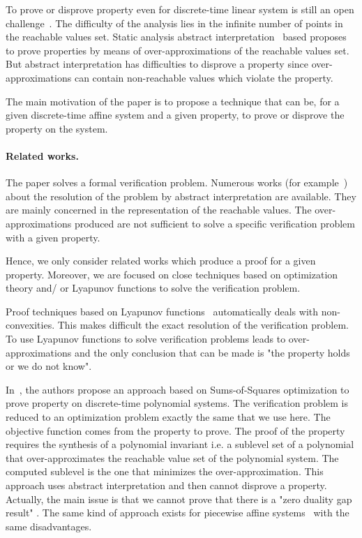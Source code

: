 \documentclass[10pt]{llncs}
\begin{document}
To prove or disprove property even for discrete-time linear system is still an open challenge~\cite{acceleration-popl14,7403149,DBLP:conf/icalp/AlmagorCO018}.  The difficulty of the analysis lies in the infinite number of points in the reachable values set. Static analysis abstract interpretation~\cite{cousot2001abstract} based proposes to prove properties by means of over-approximations of the reachable values set. But abstract interpretation has difficulties to disprove a property since over-approximations can contain non-reachable values which violate the property.

The main motivation of the paper is to propose a technique that can be, for a given discrete-time affine system and a given property, to prove or disprove the property on the system.    

\paragraph{Related works.} 
The paper solves a formal verification problem. Numerous works (for example~\cite{DBLP:journals/corr/abs-1111-5223,gonnord2014abstract,mine-ESOP16,Sankaranarayanan_BenSassi__2017__Template}) about the resolution of the problem by abstract interpretation are available. They are mainly concerned in the representation of the reachable values. The over-approximations produced are not sufficient to solve a specific verification problem with a given property.

Hence, we only consider related works which produce a proof for a given property. Moreover, we are focused on close techniques based on optimization theory and/ or Lyapunov functions to solve the verification problem. 

Proof techniques based on Lyapunov functions~\cite{roozbehani2013optimization,blanchini2009lyapunov} automatically deals with non-convexities. This makes difficult the exact resolution of the verification problem. To use Lyapunov functions to solve verification problems leads  to over-approximations and the only conclusion that can be made is "the property holds or we do not know".

In~\cite{adje2015property}, the authors propose  an approach based on Sums-of-Squares optimization to prove property on discrete-time polynomial systems. The verification problem is reduced to an optimization problem exactly the same that we use here.  The objective function comes from the property to prove. The proof of the property requires the synthesis of a polynomial invariant i.e.  a sublevel set of a polynomial that over-approximates the reachable value set of the polynomial system. The computed sublevel is the one that minimizes the over-approximation. This approach uses abstract interpretation and then cannot disprove a property. Actually, the main issue is that we cannot prove that there is a "zero duality gap result" . The same kind of approach exists for piecewise affine systems~\cite{10.1007/978-3-319-54292-8_2} with the same disadvantages. 
\end{document}
